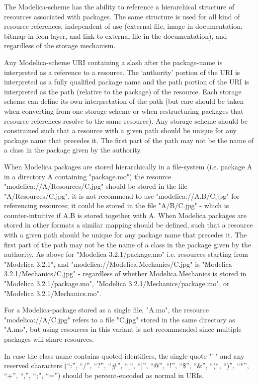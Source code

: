 The Modelica-scheme has the ability to reference a hierarchical
structure of resources associated with packages. The same structure is
used for all kind of resource references, independent of use (external
file, image in documentation, bitmap in icon layer, and link to external
file in the documentation), and regardless of the storage mechanism.

Any Modelica-scheme URI containing a slash after the package-name is
interpreted as a reference to a resource. The `authority' portion of the
URI is interpreted as a fully qualified package name and the path
portion of the URI is interpreted as the path (relative to the package)
of the resource. Each storage scheme can define its own interpretation
of the path (but care should be taken when converting from one storage
scheme or when restructuring packages that resource references resolve
to the same resource). Any storage scheme should be constrained such
that a resource with a given path should be unique for any package name
that precedes it. The first part of the path may not be the name of a
class in the package given by the authority.

When Modelica packages are stored hierarchically in a file-system (i.e.
package A in a directory A containing "package.mo") the resource
"modelica://A/Resources/C.jpg" should be stored in the file
"A/Resources/C.jpg", it is not recommend to use "modelica://A.B/C.jpg"
for referencing resources; it could be stored in the file "A/B/C.jpg" -
which is counter-intuitive if A.B is stored together with A. When
Modelica packages are stored in other formats a similar mapping should
be defined, such that a resource with a given path should be unique for
any package name that precedes it. The first part of the path may not be
the name of a class in the package given by the authority. As above for
"Modelica 3.2.1/package.mo" i.e. resources starting from "Modelica
3.2.1", and "modelica://Modelica.Mechanics/C.jpg" is "Modelica
3.2.1/Mechanics/C.jpg" - regardless of whether Modelica.Mechanics is
stored in "Modelica 3.2.1/package.mo", "Modelica
3.2.1/Mechanics/package.mo", or "Modelica 3.2.1/Mechanics.mo".

For a Modelica-package stored as a single file, "A.mo", the resource
"modelica://A/C.jpg" refers to a file "C.jpg" stored in the same
directory as "A.mo", but using resources in this variant is not
recommended since multiple packages will share resources.

In case the class-name contains quoted identifiers, the single-quote "`"
and any reserved characters (``:'', ``/'', ``?'', ``\#'', ``{[}``,
``{]}'', ``@'', ``!'', ``\$'', ``\&'', ``(``, ``)'', ``*'', ``+'',
``,'', ``;'', ``='') should be percent-encoded as normal in URIs.

